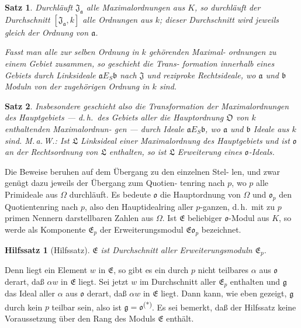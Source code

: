 \documentclass[12pt,a4paper]{article}
\theoremstyle{plain}
\newtheorem*{satz}{Satz}
\newtheorem*{lemma}{Hilfssatz}
\begin{document}
\begin{satz}\label{satz:4}
Durchl\"auft $\mathfrak{J}_{\mathfrak{a}}$ alle Maximalordnungen aus $K$, so
durchl\"auft der Durchschnitt $[\mathfrak{J}_{\mathfrak{a}}, k]$ alle Ordnungen aus $k$;
dieser Durchschnitt wird jeweils gleich der Ordnung von $\mathfrak{a}$.

Fasst man alle zur selben Ordnung in $k$ geh\"orenden Maximal-
ordnungen zu einem \emph{Gebiet} zusammen, so geschieht die Trans-
formation innerhalb eines Gebiets durch Linksideale $\mathfrak{a} E_S \mathfrak{b}$ nach
$\mathfrak{J}$ und reziproke Rechtsideale, wo $\mathfrak{a}$ und $\mathfrak{b}$ Moduln von der
zugeh\"origen Ordnung in $k$ sind.
\end{satz}

\begin{satz}\label{satz:4a}
Insbesondere geschieht also die Transformation
der Maximalordnungen des Hauptgebiets --- d.\,h.\ des Gebiets
aller die Hauptordnung $\mathfrak{O}$ von $k$ enthaltenden Maximalordnun-
gen --- durch Ideale $\mathfrak{a} E_S \mathfrak{b}$, wo $\mathfrak{a}$ und $\mathfrak{b}$ Ideale aus $k$ sind.
M.\,a.\,W.:
Ist $\mathfrak{L}$ Linksideal einer Maximalordnung des Hauptgebiets und
ist $\mathfrak{o}$ an der Rechtsordnung von $\mathfrak{L}$ enthalten, so ist $\mathfrak{L}$ Erweiterung
eines $\mathfrak{o}$-Ideals.
\end{satz}


Die Beweise beruhen auf dem \"Ubergang zu den einzelnen Stel-
len, und zwar gen\"ugt dazu jeweils der \"Ubergang zum Quotien-
 tenring nach $p$, wo $p$ alle Primideale aus $\Omega$ durchl\"auft. Es bedeute
$\mathfrak{o}$ die Hauptordnung von $\Omega$ und $\mathfrak{o}_p$ den Quotientenring nach $p$, also
den Hauptidealring aller $p$-ganzen, d.\,h.\ mit zu $p$ primen Nennern
darstellbaren Zahlen aus $\Omega$. Ist $\mathfrak{E}$ beliebiger $\mathfrak{o}$-Modul aus $K$, so
werde als Komponente $\mathfrak{E}_p$ der Erweiterungsmodul $\mathfrak{E} \mathfrak{o}_p$ bezeichnet.

\begin{lemma}[Hilfssatz]
$\mathfrak{E}$ ist Durchschnitt aller Erweiterungsmoduln $\mathfrak{E}_p$.
\end{lemma}

Denn liegt ein Element $w$ in $\mathfrak{E}$, so gibt es ein durch $p$ nicht
teilbares $\alpha$ aus $\mathfrak{o}$ derart, da\ss{} $\alpha w$ in $\mathfrak{E}$ liegt. Sei jetzt $w$ im
Durchschnitt aller $\mathfrak{E}_p$ enthalten und $\mathfrak{g}$ das Ideal aller $\alpha$ aus $\mathfrak{o}$
derart, da\ss{} $\alpha w$ in $\mathfrak{E}$ liegt. Dann kann, wie eben gezeigt, $\mathfrak{g}$ durch
kein $p$ teilbar sein, also ist $\mathfrak{g} = \mathfrak{o}$\textsuperscript{(*)}. Es sei bemerkt, da\ss{} der
Hilfssatz keine Voraussetzung \"uber den Rang des Moduls $\mathfrak{E}$ enth\"alt.
\end{document}
